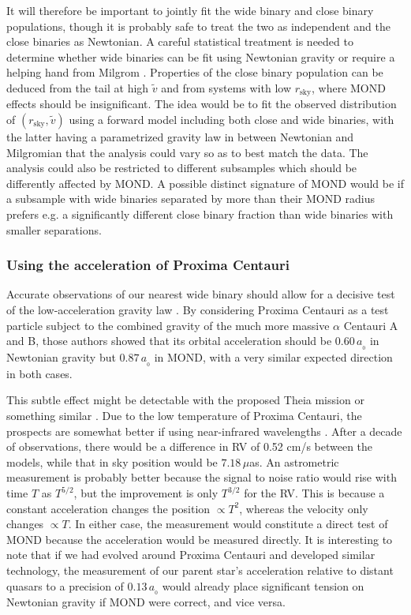 \documentclass[fleqn,usenatbib,useAMS]{mnras} %
\begin{document}
It will therefore be important to jointly fit the wide binary and close binary populations, though it is probably safe to treat the two as independent and the close binaries as Newtonian. A careful statistical treatment is needed to determine whether wide binaries can be fit using Newtonian gravity or require a helping hand from Milgrom \citep*[for a detailed plan, see][]{Banik_2021_plan}. Properties of the close binary population can be deduced from the tail at high $\widetilde{v}$ and from systems with low $r_{\text{sky}}$, where MOND effects should be insignificant. The idea would be to fit the observed distribution of $\left( r_{\text{sky}}, \widetilde{v} \right)$ using a forward model including both close and wide binaries, with the latter having a parametrized gravity law in between Newtonian and Milgromian that the analysis could vary so as to best match the data. The analysis could also be restricted to different subsamples which should be differently affected by MOND. A possible distinct signature of MOND would be if a subsample with wide binaries separated by more than their MOND radius prefers e.g. a significantly different close binary fraction than wide binaries with smaller separations.


\subsubsection{Using the acceleration of Proxima Centauri}
\label{Wide_binaries_using_Proxima}

Accurate observations of our nearest wide binary should allow for a decisive test of the low-acceleration gravity law \citep{Banik_2019_Proxima}. By considering Proxima Centauri as a test particle subject to the combined gravity of the much more massive $\alpha$ Centauri A and B, those authors showed that its orbital acceleration should be $0.60 \, a_{_0}$ in Newtonian gravity but $0.87 \, a_{_0}$ in MOND, with a very similar expected direction in both cases.

This subtle effect might be detectable with the proposed Theia mission \citep{Theia_2017} or something similar \citep{Hobbs_2021}. Due to the low temperature of Proxima Centauri, the prospects are somewhat better if using near-infrared wavelengths \citep{Malbet_2021}. After a decade of observations, there would be a difference in RV of 0.52 cm/s between the models, while that in sky position would be $7.18 \, \mu$as. An astrometric measurement is probably better because the signal to noise ratio would rise with time $T$ as $T^{5/2}$, but the improvement is only $T^{3/2}$ for the RV. This is because a constant acceleration changes the position $\propto T^2$, whereas the velocity only changes $\propto T$. In either case, the measurement would constitute a direct test of MOND because the acceleration would be measured directly. It is interesting to note that if we had evolved around Proxima Centauri and developed similar technology, the measurement of our parent star's acceleration relative to distant quasars to a precision of $0.13 \, a_{_0}$ \citep{Klioner_2021} would already place significant tension on Newtonian gravity if MOND were correct, and vice versa.
\end{document}
